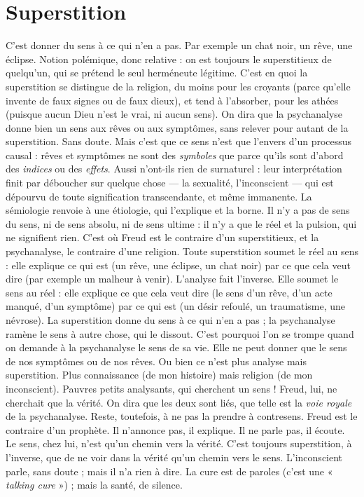 \section{Superstition}
C’est donner du sens à ce qui n’en a pas. Par exemple un
chat noir, un rêve, une éclipse. Notion polémique, donc
relative : on est toujours le superstitieux de quelqu'un, qui se prétend le seul
herméneute légitime. C’est en quoi la superstition se distingue de la religion,
du moins pour les croyants (parce qu’elle invente de faux signes ou de faux
dieux), et tend à l’absorber, pour les athées (puisque aucun Dieu n’est le vrai,
ni aucun sens).
On dira que la psychanalyse donne bien un sens aux rêves ou aux symptômes,
sans relever pour autant de la superstition. Sans doute. Mais c’est que
ce sens n’est que l’envers d’un processus causal : rêves et symptômes ne sont des
{\it symboles} que parce qu’ils sont d’abord des {\it indices} ou des {\it effets}. Aussi n’ont-ils
rien de surnaturel : leur interprétation finit par déboucher sur quelque chose —
la sexualité, l'inconscient — qui est dépourvu de toute signification transcendante,
et même immanente. La sémiologie renvoie à une étiologie, qui
l'explique et la borne. Il n’y a pas de sens du sens, ni de sens absolu, ni de sens
ultime : il n’y a que le réel et la pulsion, qui ne signifient rien. C’est où Freud
est le contraire d’un superstitieux, et la psychanalyse, le contraire d’une religion.
Toute superstition soumet le réel au sens : elle explique ce qui est (un
rêve, une éclipse, un chat noir) par ce que cela veut dire (par exemple un malheur
à venir). L'analyse fait l'inverse. Elle soumet le sens au réel : elle explique
ce que cela veut dire (le sens d’un rêve, d’un acte manqué, d’un symptôme) par
ce qui est (un désir refoulé, un traumatisme, une névrose). La superstition
donne du sens à ce qui n’en a pas ; la psychanalyse ramène le sens à autre chose,
qui le dissout. C’est pourquoi l’on se trompe quand on demande à la psychanalyse
le sens de sa vie. Elle ne peut donner que le sens de nos symptômes ou
de nos rêves. Ou bien ce n’est plus analyse mais superstition. Plus connaissance
(de mon histoire) mais religion (de mon inconscient). Pauvres petits analysants,
qui cherchent un sens ! Freud, lui, ne cherchait que la vérité. On dira que les
deux sont liés, que telle est la {\it voie royale} de la psychanalyse. Reste, toutefois,
à ne pas la prendre à contresens. Freud est le contraire d’un prophète. Il
n'annonce pas, il explique. Il ne parle pas, il écoute. Le sens, chez lui, n’est
qu'un chemin vers la vérité. C’est toujours superstition, à l'inverse, que de ne
voir dans la vérité qu’un chemin vers le sens. L’inconscient parle, sans doute ;
mais il n’a rien à dire. La cure est de paroles (c’est une « {\it talking cure} ») ; mais la
santé, de silence.

